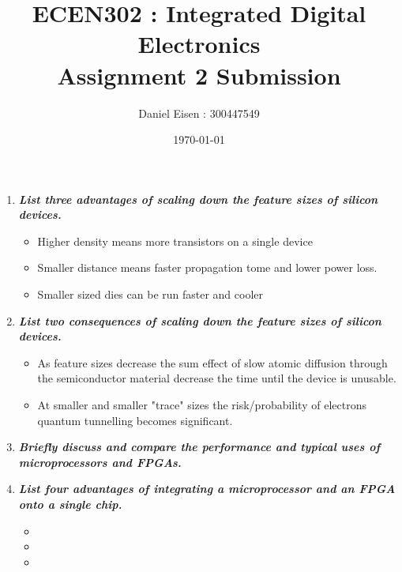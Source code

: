 \documentclass[11pt]{article}
\title{ECEN302 : Integrated Digital Electronics \\ Assignment 2 Submission}
\author{Daniel Eisen : 300447549}
\date{\today}
\begin{document}
\begin{preview}
\maketitle
\begin{enumerate}
    \item \textit{\textbf{List three advantages of scaling down the feature sizes of silicon devices.}}
    
    \begin{itemize}
        \item Higher density means more transistors on a single device
        \item Smaller distance means faster propagation tome and lower power loss.
        \item Smaller sized dies can be run faster and cooler 
    \end{itemize}
    
    \item \textit{\textbf{List two consequences of scaling down the feature sizes of silicon devices.}}
    
    \begin{itemize}
        \item As feature sizes decrease the sum effect of slow atomic diffusion through the semiconductor material decrease the time until the device is unusable.
        \item At smaller and smaller "trace" sizes the risk/probability of electrons quantum tunnelling becomes significant.  
    \end{itemize}
    
    \item \textit{\textbf{Briefly discuss and compare the performance and typical uses of microprocessors and FPGAs.}}
    
    
    
    \item \textit{\textbf{List four advantages of integrating a microprocessor and an FPGA onto a single chip.}}
    
    \begin{itemize}
        \item 
        \item 
        \item 
    \end{itemize}
    

\end{enumerate}
\end{preview}
\end{document}
